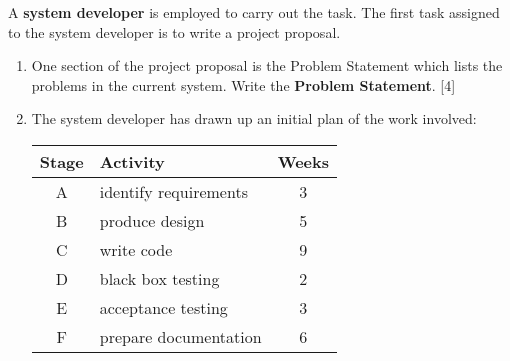A \textbf{system developer} is employed to carry out the task. The
first task assigned to the system developer is to write a project
proposal. 
\begin{enumerate}
\item One section of the project proposal is the Problem Statement which
lists the problems in the current system. Write the \textbf{Problem
Statement}. {[}4{]}
\item The system developer has drawn up an initial plan of the work involved: 
\noindent \begin{center}
\begin{tabular}{|c|l|c|}
\hline 
\textbf{Stage} & \textbf{Activity} & \textbf{Weeks}\tabularnewline
\hline 
A & identify requirements & 3\tabularnewline
\hline 
B & produce design & 5\tabularnewline
\hline 
C & write code & 9\tabularnewline
\hline 
D & black box testing & 2\tabularnewline
\hline 
E & acceptance testing & 3\tabularnewline
\hline 
F & prepare documentation & 6\tabularnewline
\hline 
\end{tabular}
\par\end{center}


\end{enumerate}
